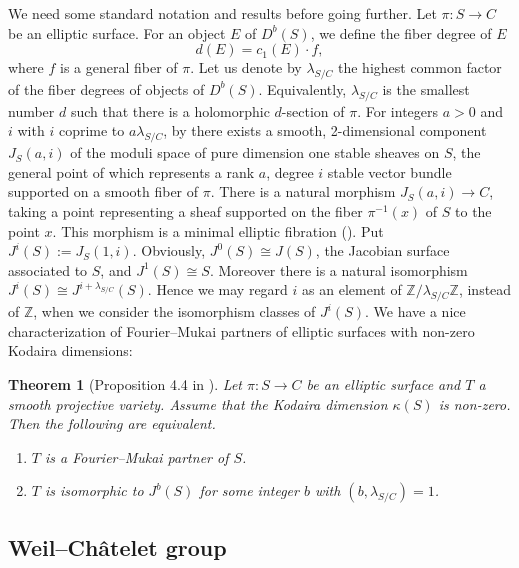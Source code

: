 \documentclass[a4paper,11pt]{article}
\newtheorem{thm}{Theorem}[section]
\theoremstyle{definition}\newtheorem{defn}[thm]{Definition}
\theoremstyle{remark}\newtheorem{remark}[thm]{Remark}
\numberwithin{equation}{section}
\renewcommand{\labelenumi}{(\roman{enumi})}
\newcommand{\Z}{\mathbb Z}
\begin{document}
We need some standard notation and results before going further.
Let $\pi:S\to C$ be an elliptic surface.
For an object $E$ of $D^b(S)$, we define the fiber degree of $E$ 
\[d(E)=c_1(E)\cdot f, \]
where $f$ is a general fiber of $\pi$. Let us denote by $\lambda_{S/C}$  
the highest common factor of the fiber degrees of objects of $D^b(S)$. 
Equivalently,
$\lambda_{S/ C}$ is the smallest number $d$ such that there is a 
holomorphic $d$-section of $\pi$. 
For integers $a>0$ and $i$ with $i$ coprime to $a\lambda_{S/ C}$, 
by \cite{Br98} there exists a smooth,
2-dimensional component $J_S (a,i)$ of the moduli space of pure dimension 
one stable sheaves on $S$,
the general point of which represents a rank $a$, degree $i$ stable 
vector bundle supported on a smooth fiber of $\pi$. 
There is a natural morphism $J_S (a,i)\to C$, taking a point representing
 a sheaf supported on the
fiber $\pi ^{-1}(x)$ of $S$ to the point $x$. This morphism is a minimal 
elliptic fibration (\cite{Br98}).
Put $J^i(S):=J_S(1,i)$. 
Obviously, $J^0(S)\cong J(S)$, the Jacobian surface associated to $S$, 
and $J^1(S)\cong S$. 
Moreover there is a natural isomorphism $J^i(S)\cong J^{i+\lambda_{S/C}}(S)$.
Hence we may regard $i$ as an element of $\Z/\lambda_{S/C}\Z$, 
instead of $\Z$,
when we consider the isomorphism classes of $J^i(S)$. 
We have a nice characterization of 
Fourier--Mukai partners of elliptic surfaces with non-zero Kodaira dimensions:
 
 

\begin{thm}[Proposition 4.4 in \cite{BM01}]\label{BMelliptic}
Let $\pi :S\to C$ be an elliptic surface and $T$ a smooth projective variety.
Assume that the Kodaira dimension $\kappa (S)$ is non-zero.
Then the following are equivalent.
\renewcommand{\labelenumi}{(\roman{enumi})}
\begin{enumerate}
\item 
$T$ is a Fourier--Mukai partner of $S$. 
\item 
$T$ is isomorphic to $J^b(S)$ for some integer $b$ with $(b,\lambda _{S/C})=1$. 
\end{enumerate}
\end{thm}


\subsection{Weil--Ch\^atelet group}\label{subsection:WC}
\end{document}
